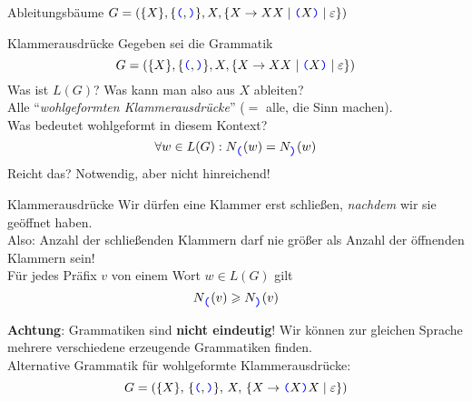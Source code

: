 \begin{frame}{Ableitungsbäume}
	\centering
	$G = (\{X\}, \{\hbox{\textcolor{blue}{\texttt{(}}}, \hbox{\textcolor{blue}{\texttt{)}}}\}, X, \{X \to XX \mid \hbox{\textcolor{blue}{\texttt{(}}}X\hbox{\textcolor{blue}{\texttt{)}}} \mid \varepsilon\})$
	\medskip
	
\end{frame}


\begin{frame}{Klammerausdrücke}
	Gegeben sei die Grammatik $$G = (\{X\}, \{\hbox{\textcolor{blue}{\texttt{(}}}, \hbox{\textcolor{blue}{\texttt{)}}}\}, X, \{X \to XX \mid \hbox{\textcolor{blue}{\texttt{(}}}X\hbox{\textcolor{blue}{\texttt{)}}} \mid \varepsilon\})$$
	Was ist $L(G)$? Was kann man also aus $X$ ableiten?\\ \pause 
	Alle \enquote{\textit{wohlgeformten Klammerausdrücke}} \quad ($=$ alle, die Sinn machen).\\[1em]
	
	Was bedeutet wohlgeformt in diesem Kontext?\\ \pause
	$$\forall w \in L(G): N_{\hbox{\textcolor{blue}{\texttt{(}}}}(w) = N_{\hbox{\textcolor{blue}{\texttt{)}}}}(w)$$ 
	Reicht das? \pause \impl Notwendig, aber nicht hinreichend! 

\end{frame}

\begin{frame}{Klammerausdrücke}
	Wir dürfen eine Klammer erst schließen, \textit{nachdem} wir sie geöffnet haben.\\
	Also: Anzahl der schließenden Klammern darf nie größer als Anzahl der öffnenden Klammern sein! \pause \\[1em]
	\impl Für jedes Präfix $v$ von einem Wort $w \in L(G)$ gilt $$N_{\hbox{\textcolor{blue}{\texttt{(}}}} (v) \geqslant N_{\hbox{\textcolor{blue}{\texttt{)}}}} (v)$$ \pause
	
	\textbf{Achtung}: Grammatiken sind \textbf{nicht eindeutig}! Wir können zur gleichen Sprache mehrere verschiedene erzeugende Grammatiken finden. \\
	Alternative Grammatik für wohlgeformte Klammerausdrücke: \pause $$G = (\{X\}, \, \{\hbox{\textcolor{blue}{\texttt{(}}}, \hbox{\textcolor{blue}{\texttt{)}}}\}, \, X, \, \{X \to \hbox{\textcolor{blue}{\texttt{(}}}X\hbox{\textcolor{blue}{\texttt{)}}}X \mid \varepsilon\})$$
\end{frame}

